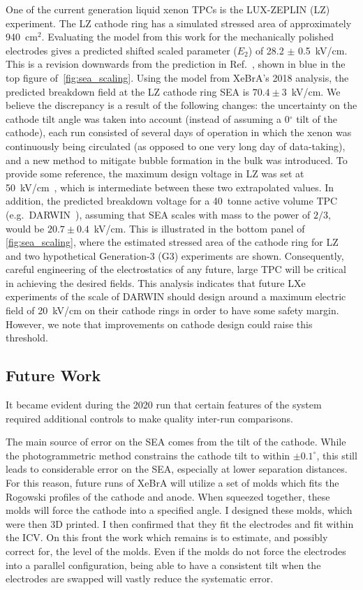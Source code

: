 One of the current generation liquid xenon TPCs is the LUX-ZEPLIN (LZ) experiment. 
The LZ cathode ring has a simulated stressed area of approximately 940~cm$^2$.
Evaluating the model from this work for the mechanically polished electrodes gives a predicted shifted scaled parameter ($E_2$) of 28.2 $\pm$ 0.5~kV/cm.
This is a revision downwards from the prediction in Ref.~\cite{tvrznikova_direct_2019}, shown in blue in the top figure of~\ref{fig:sea_scaling}. 
Using the model from XeBrA's 2018 analysis, the predicted breakdown field at the LZ cathode ring SEA is $70.4 \pm 3$~kV/cm.
We believe the discrepancy is a result of the following changes: the uncertainty on the cathode tilt angle was taken into account (instead of assuming a 0$^{\circ}$ tilt of the cathode), each run consisted of several days of operation in which the xenon was continuously being circulated (as opposed to one very long day of data-taking), and a new method to mitigate bubble formation in the bulk was introduced. 
To provide some reference, the maximum design voltage in LZ was set at 50~kV/cm~\cite{mount_lux-zeplin_2017}, which is intermediate between these two extrapolated values.
In addition, the predicted breakdown voltage for a 40~tonne active volume TPC (e.g.~DARWIN~\cite{aalbers_darwin_2016}), assuming that SEA scales with mass to the power of $2/3$, would be $20.7 \pm 0.4$~kV/cm.
This is illustrated in the bottom panel of \ref{fig:sea_scaling}, where the estimated stressed area of the cathode ring for LZ and two hypothetical Generation-3 (G3) experiments are shown.
Consequently, careful engineering of the electrostatics of any future, large TPC will be critical in achieving the desired fields. 
This analysis indicates that future LXe experiments of the scale of DARWIN should design around a maximum electric field of 20~kV/cm on their cathode rings in order to have some safety margin. However, we note that improvements on cathode design could raise this threshold.
\subsection{Future Work}
It became evident during the 2020 run that certain features of the system required additional controls to make quality inter-run comparisons.

The main source of error on the SEA comes from the tilt of the cathode.
While the photogrammetric method constrains the cathode tilt to within $\pm 0.1^\circ$, this still leads to considerable error on the SEA, especially at lower separation distances.
For this reason, future runs of XeBrA will utilize a set of molds which fits the Rogowski profiles of the cathode and anode.
When squeezed together, these molds will force the cathode into a specified angle.
I designed these molds, which were then 3D printed.
I then confirmed that they fit the electrodes and fit within the ICV.
On this front the work which remains is to estimate, and possibly correct for, the level of the molds.
Even if the molds do not force the electrodes into a parallel configuration, being able to have a consistent tilt when the electrodes are swapped will vastly reduce the systematic error.


